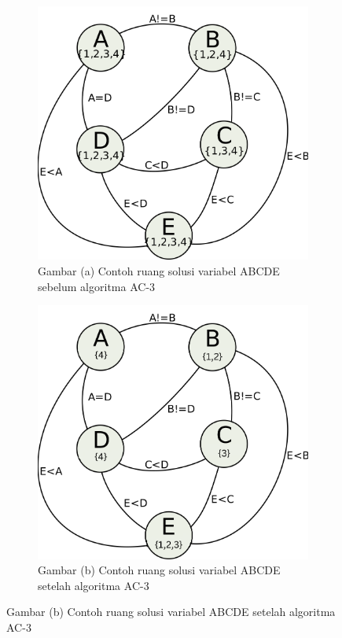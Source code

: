 \documentclass[a4paper,twoside]{article}
\begin{document}
	\begin{figure}[H]
		\centering
		
		\begin{subfigure}{0.35\textwidth}
			\centering
			\includegraphics[width=\linewidth]{images/AC3_start.png}
			\caption*{Gambar \thefigure(a) Contoh ruang solusi variabel ABCDE sebelum algoritma AC-3}
			\label{fig:AC3_start}
		\end{subfigure}
		\hspace{2cm}
		\begin{subfigure}{0.35\textwidth}
			\centering
			\includegraphics[width=\linewidth]{images/AC3_end.png}
			\caption*{Gambar \thefigure(b) Contoh ruang solusi variabel ABCDE setelah algoritma AC-3}
			\label{fig:AC3_end}
		\end{subfigure}
	\end{figure}
	
\end{document}
